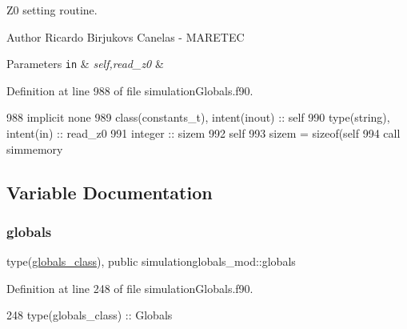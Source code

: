 Z0 setting routine. 

\begin{DoxyAuthor}{Author}
Ricardo Birjukovs Canelas -\/ M\+A\+R\+E\+T\+EC 
\end{DoxyAuthor}

\begin{DoxyParams}[1]{Parameters}
\mbox{\tt in}  & {\em self,read\+\_\+z0} & \\
\hline
\end{DoxyParams}


Definition at line 988 of file simulation\+Globals.\+f90.


\begin{DoxyCode}
988     \textcolor{keywordtype}{implicit none}
989     \textcolor{keywordtype}{class}(constants\_t), \textcolor{keywordtype}{intent(inout)} :: self
990     \textcolor{keywordtype}{type}(string), \textcolor{keywordtype}{intent(in)} :: read\_z0
991     \textcolor{keywordtype}{integer} :: sizem
992     self%
993     sizem = sizeof(self%
994     \textcolor{keyword}{call }simmemory%
\end{DoxyCode}


\subsection{Variable Documentation}
\mbox{\label{namespacesimulationglobals__mod_acf1e2786d81bd0fe337a8458efce8733}} 
\subsubsection{\texorpdfstring{globals}{globals}}
{\footnotesize\ttfamily type(\mbox{\hyperlink{structsimulationglobals__mod_1_1globals__class}{globals\+\_\+class}}), public simulationglobals\+\_\+mod\+::globals}



Definition at line 248 of file simulation\+Globals.\+f90.


\begin{DoxyCode}
248     \textcolor{keywordtype}{type}(globals\_class) :: Globals
\end{DoxyCode}
\mbox{\label{namespacesimulationglobals__mod_a359d52eab96ddcaba05e0504eff0ef37}} 
